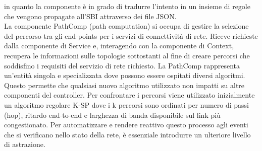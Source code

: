 in quanto la componente è in grado di tradurre l'intento in un insieme di regole che vengono propagate all'SBI attraverso dei file JSON.
\\La componente PathComp (path computation) si occupa di gestire la selezione del percorso tra gli end-points per i servizi di connettività di rete. 
Riceve richieste dalla componente di Service e, interagendo con la componente di Context, recupera le informazioni sulle topologie sottostanti al fine di creare
percorsi che soddisfino i requisiti del servizio di rete richiesto.
La PathComp rappresenta un'entità singola e specializzata dove possono essere ospitati diversi algoritmi. Questo permette che qualsiasi nuovo algoritmo utilizzato non impatti su altre componenti del controller.
Per confrontare i percorsi viene utilizzato inizialmente un algoritmo regolare K-SP dove i k percorsi sono ordinati per numero di passi (hop), ritardo end-to-end e larghezza di banda disponibile sul link più congestionato. 
Per automatizzare e rendere reattivo questo processo agli eventi che si verificano nello stato della rete, è essenziale introdurre un ulteriore livello di astrazione.

